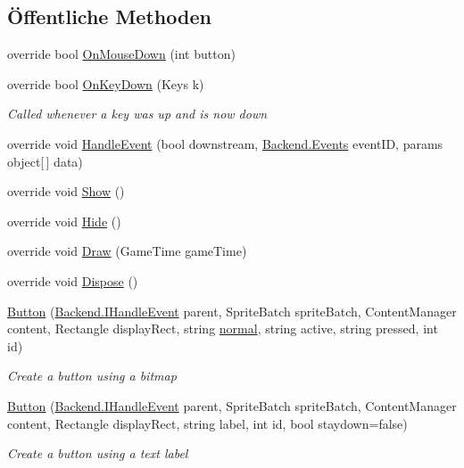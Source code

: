 \subsection*{Öffentliche Methoden}
\begin{DoxyCompactItemize}
\item 
override bool \hyperlink{class_gruppe22_1_1_client_1_1_button_aa6c6ba54e6549ee851153040fda87b0e}{On\-Mouse\-Down} (int button)
\item 
override bool \hyperlink{class_gruppe22_1_1_client_1_1_button_ad3b8e8bceadd5999af01485ed178446b}{On\-Key\-Down} (Keys k)
\begin{DoxyCompactList}\small\item\em Called whenever a key was up and is now down \end{DoxyCompactList}\item 
override void \hyperlink{class_gruppe22_1_1_client_1_1_button_a261239329db8106d9535190252571c03}{Handle\-Event} (bool downstream, \hyperlink{namespace_gruppe22_1_1_backend_ab56df91bb0bdafa1ea978e552209ce73}{Backend.\-Events} event\-I\-D, params object\mbox{[}$\,$\mbox{]} data)
\item 
override void \hyperlink{class_gruppe22_1_1_client_1_1_button_a584d2c127a7cfe8eb99c04b941aa7b68}{Show} ()
\item 
override void \hyperlink{class_gruppe22_1_1_client_1_1_button_a61fb3c2d7818fbac7131ffde637aaf3f}{Hide} ()
\item 
override void \hyperlink{class_gruppe22_1_1_client_1_1_button_a805e61d5517639ffe611f153ca19c1f3}{Draw} (Game\-Time game\-Time)
\item 
override void \hyperlink{class_gruppe22_1_1_client_1_1_button_ac2f181c74d65c94b08b86d322b22eb28}{Dispose} ()
\item 
\hyperlink{class_gruppe22_1_1_client_1_1_button_a5eb3d481c8c582938b5df89d331ba4d2}{Button} (\hyperlink{interface_gruppe22_1_1_backend_1_1_i_handle_event}{Backend.\-I\-Handle\-Event} parent, Sprite\-Batch sprite\-Batch, Content\-Manager content, Rectangle display\-Rect, string \hyperlink{namespace_gruppe22_1_1_client_ab04cc66caef13cf24be10621da9097e2afea087517c26fadd409bd4b9dc642555}{normal}, string active, string pressed, int id)
\begin{DoxyCompactList}\small\item\em Create a button using a bitmap \end{DoxyCompactList}\item 
\hyperlink{class_gruppe22_1_1_client_1_1_button_acfe21f1b4fc2cdedd3689a3c73aea3d6}{Button} (\hyperlink{interface_gruppe22_1_1_backend_1_1_i_handle_event}{Backend.\-I\-Handle\-Event} parent, Sprite\-Batch sprite\-Batch, Content\-Manager content, Rectangle display\-Rect, string label, int id, bool staydown=false)
\begin{DoxyCompactList}\small\item\em Create a button using a text label \end{DoxyCompactList}\end{DoxyCompactItemize}
